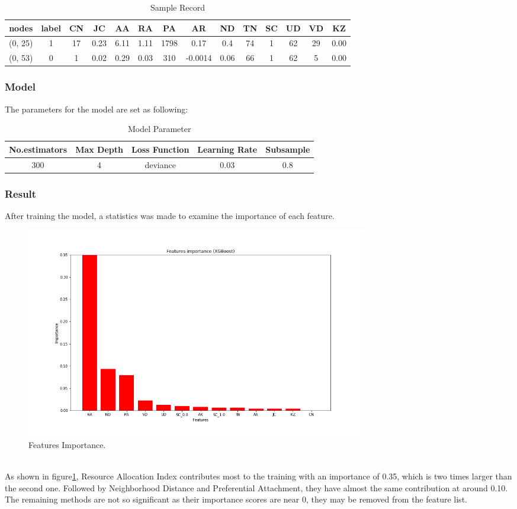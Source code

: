 \documentclass{article}
\begin{document}
\begin{table}[h!]
	\centering
	\caption{Sample Record}
	\begin{tabular}{cccccccccccccc}
		\hline
		nodes& label& CN& JC& AA& RA& PA& AR& ND& TN& SC& UD& VD& KZ\\
		\hline
		(0, 25)& 1& 17& 0.23& 6.11& 1.11& 1798& 0.17& 0.4& 74& 1& 62& 29& 0.00\\
		(0, 53)& 0& 1& 0.02& 0.29& 0.03& 310& -0.0014& 0.06& 66& 1& 62& 5& 0.00\\
		\hline
	\end{tabular}
\end{table}


\subsubsection{Model}
The parameters for the model are set as following:\\
\begin{table}[h]
	\centering
	\caption{Model Parameter}
	\begin{tabular}{ccccc}
		\hline
		No.estimators& Max Depth& Loss Function& Learning Rate& Subsample\\
		\hline
		300& 4& deviance& 0.03& 0.8\\
		\hline
	\end{tabular}
\end{table}

\subsubsection{Result}
After training the model, a statistics was made to examine the importance of each feature. \\
\begin{figure}[h!]
	\includegraphics[width=15cm]{images/feature.png}
	\centering
	\caption{Features Importance.}\label{feature}
\end{figure}\\
As shown in figure\ref{feature}, Resource Allocation Index contributes most to the training with an importance of 0.35, which is two times larger than the second one. Followed by Neighborhood Distance and Preferential Attachment, they have almost the same contribution at around 0.10. The remaining methods are not so significant as their importance scores are near 0, they may be removed from the feature list.    \\
\end{document}
